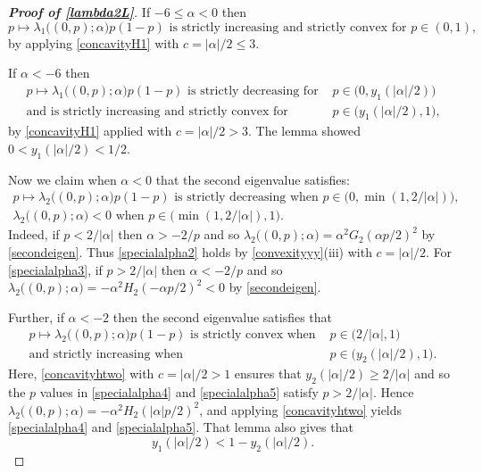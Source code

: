 \documentclass[12pt,reqno]{amsart}
\theoremstyle{definition}
\newcommand{\gt}{G_2}
\newcommand{\htwo}{H_2}
\begin{document}
\begin{proof}[\bf Proof of \autoref{lambda2L}]
If $-6 \leq \alpha < 0$ then 
%
\begin{equation} \label{specialalpha}
\text{$p \mapsto \lambda_1\big( (0,p); \alpha\big) p(1-p)$ is strictly increasing and strictly convex for $p \in (0,1)$,}
\end{equation}
%
by applying \autoref{concavityH1} with $c=|\alpha|/2 \leq 3$. 

If $\alpha < -6$ then 
%
\begin{align} 
\text{$p \mapsto \lambda_1\big( (0,p); \alpha\big) p(1-p)$ is strictly decreasing for\ } & \text{$p \in \big(0,y_1(|\alpha|/2)\big)$} \label{specialalpha6} \\
\text{and is strictly increasing and strictly convex for\ } & \text{$p \in \big(y_1(|\alpha|/2),1\big)$,} \label{specialalpha7}
\end{align}
%
by \autoref{concavityH1} applied with $c=|\alpha|/2 > 3$. The lemma showed $0<y_1(|\alpha|/2)<1/2$.

Now we claim when $\alpha < 0$ that the second eigenvalue satisfies:
%
\begin{align} 
\text{$p \mapsto \lambda_2\big( (0,p); \alpha\big) p(1-p)$ is strictly decreasing when $p \in \big(0,\min(1,2/|\alpha|) \big)$,} \label{specialalpha2} \\
\text{$\lambda_2\big( (0,p); \alpha\big) < 0$ when $p \in \big(\! \min(1,2/|\alpha|),1 \big)$.} \label{specialalpha3}
\end{align}
%
Indeed, if $p<2/|\alpha|$ then $\alpha>-2/p$ and so $\lambda_2\big( (0,p); \alpha\big) = \alpha^2 \gt(\alpha p/2)^2$ by \autoref{secondeigen}. Thus \eqref{specialalpha2} holds by \autoref{convexityyy}(iii) with $c=|\alpha|/2$. For \eqref{specialalpha3}, if $p>2/|\alpha|$ then $\alpha<-2/p$ and so  $\lambda_2\big( (0,p); \alpha\big) = -\alpha^2 \htwo(-\alpha p/2)^2 < 0$ by \autoref{secondeigen}. 

Further, if $\alpha < -2$ then the second eigenvalue satisfies that  
%
\begin{align}
\text{$p \mapsto \lambda_2\big( (0,p); \alpha\big) p(1-p)$ is strictly convex when\ } & \text{$p \in \big( 2/|\alpha|,1 \big)$} \label{specialalpha4} \\
\text{and strictly increasing when\ } & \text{$p \in \big( y_2(|\alpha|/2),1 \big)$.} \label{specialalpha5} 
\end{align}
%
Here, \autoref{concavityhtwo} with $c=|\alpha|/2>1$ ensures that $y_2(|\alpha|/2) \geq 2/|\alpha|$ and so the $p$ values in \eqref{specialalpha4} and \eqref{specialalpha5} satisfy $p>2/|\alpha|$. Hence $\lambda_2\big( (0,p); \alpha\big)= -\alpha^2 \htwo(|\alpha| p/2)^2$, and applying \autoref{concavityhtwo} yields \eqref{specialalpha4} and \eqref{specialalpha5}. That lemma also gives that 
%
\begin{equation} \label{y1y2l1}
y_1(|\alpha|/2) < 1 - y_2(|\alpha|/2) .
\end{equation}
%


\end{proof}
\end{document}
